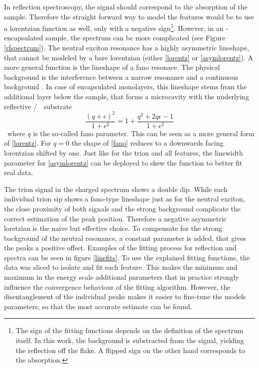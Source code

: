 In reflection spectroscopy, the signal should correspond to the absorption of the sample. Therefore the straight forward way to model the features would be to use a lorentzian function as well, only with a negative sign\footnote{The sign of the fitting functions depends on the definition of the spectrum itself. In this work, the background is substracted from the signal, yielding the reflection off the flake. A flipped sign on the other hand corresponds to the absorption.}. However, in an \hbn-encapsulated sample, the spectrum can be more complicated (see Figure \ref{rfspectrum}). The neutral exciton resonance has a highly asymmetric lineshape, that cannot be modeled by a bare lorentzian (either \eqref{lorentz} or \eqref{asymlorentz}). A more general function is the lineshape of a fano resonace. The physical background is the interference between a narrow resonance and a continuous background \cite{fano_effects_1961}. In case of encapsulated \tmdg monolayers, this lineshape stems from the additional \hbng layer below the sample, that forms a microcavity with the underlying reflective \si/\sio substrate \cite{scuri_large_2018}.
\begin{equation}
\frac{(q+\epsilon)^2}{1+\epsilon^2} = 1 + \frac{q^2+2q\epsilon-1}{1+\epsilon^2}\label{fano}
\end{equation}
where $q$ is the so-called fano parameter. This can be seen as a more general form of \eqref{lorentz}. For $q=0$ the shape of \eqref{fano} reduces to a downwards facing lorentzian shifted by one. Just like for the trion and all \pl features, the linewidth parameter for \eqref{asymlorentz} can be deployed to skew the function to better fit real data.

The trion signal in the charged spectrum shows a double dip. While each individual trion sip shows a fano-type lineshape just as for the neutral exciton, the close proximity of both signals and the strong background complicate the correct estimation of the peak position. Therefore a negative asymmetric loretzian is the naive but effective choice. To compensate for the strong background of the neutral resonance, a constant parameter is added, that gives the peaks a positive offset. 
Examples of the fitting process for reflection and \pl spectra can be seen in figure \ref{linefits}. To use the explained fitting functions, the data was sliced to isolate and fit each feature. This makes the minimum and maximum in the energy scale additional parameters that in practice strongly influence the convergence behaviour of the fitting algorithm. However, the disentanglement of the individual peaks makes it easier to fine-tune the models parameters, so that the most accurate estimate can be found.


